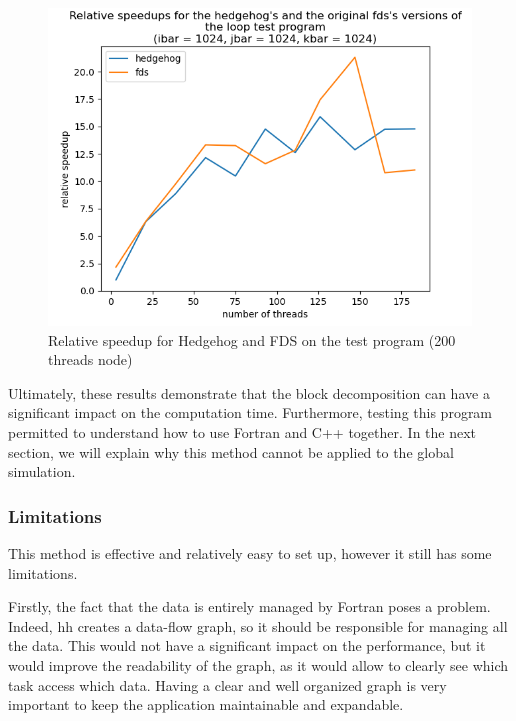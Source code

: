 \begin{figure}[ht!]
  \begin{center}
    \includegraphics[scale=0.6]{img/fds-loops/relative_speedup.png}
    \caption{Relative speedup for Hedgehog and FDS on the test program (200 threads node)}
    \label{fig:loopsrelativespeedup}
  \end{center}
\end{figure}

Ultimately, these results demonstrate that the block decomposition can have a
significant impact on the computation time. Furthermore, testing this program
permitted to understand how to use Fortran and C++ together. In the next
section, we will explain why this method cannot be applied to the global
simulation.

\subsubsection{Limitations}

This method is effective and relatively easy to set up, however it still has
some limitations.

Firstly, the fact that the data is entirely managed by Fortran poses a problem.
Indeed, \gls{hh} creates a data-flow graph, so it should be responsible for
managing all the data. This would not have a significant impact on the
performance, but it would improve the readability of the graph, as it would
allow to clearly see which task access which data. Having a clear and well
organized graph is very important to keep the application maintainable and
expandable.


